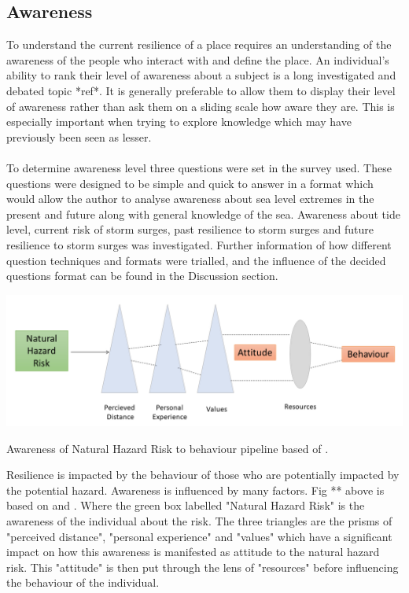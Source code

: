 \subsection{Awareness}
To understand the current resilience of a place requires an understanding of the awareness of the people who interact with and define the place. An individual’s ability to rank their level of awareness about a subject is a long investigated and debated topic *ref*. It is generally preferable to allow them to display their level of awareness rather than ask them on a sliding scale how aware they are. This is especially important when trying to explore knowledge which may have previously been seen as lesser.

\paragraph{}
To determine awareness level three questions were set in the survey used. These questions were designed to be simple and quick to answer in a format which would allow the author to analyse awareness about sea level extremes in the present and future along with general knowledge of the sea. Awareness about tide level, current risk of storm surges, past resilience to storm surges and future resilience to storm surges was investigated. Further information of how different question techniques and formats were trialled, and the influence of the decided questions format can be found in the Discussion section.

\includegraphics[width=1\textwidth]{fig_theory/awareness lujala and whitmarsh.png}

\begin{frame}{Awareness of Natural Hazard Risk to behaviour pipeline based of \cite{lujala_climate_2015}\cite{whitmarsh_are_2008}.}
\end{frame}

Resilience is impacted by the behaviour of those who are potentially impacted by the potential hazard. Awareness is influenced by many factors. Fig ** above is based on \cite{whitmarsh_are_2008} and \cite{lujala_climate_2015} . Where the green box labelled "Natural Hazard Risk" is the awareness of the individual about the risk. The three triangles are the prisms of "perceived distance", "personal experience" and "values" which have a significant impact on how this awareness is manifested as attitude to the natural hazard risk. This "attitude" is then put through the lens of "resources" before influencing the behaviour of the individual. 
